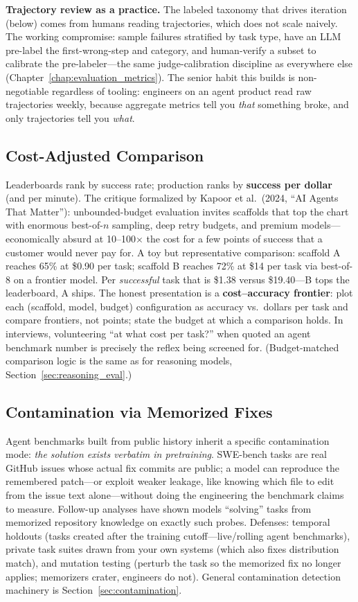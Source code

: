 \textbf{Trajectory review as a practice.} The labeled taxonomy that drives iteration (below) comes from humans reading trajectories, which does not scale naively. The working compromise: sample failures stratified by task type, have an LLM pre-label the first-wrong-step and category, and human-verify a subset to calibrate the pre-labeler---the same judge-calibration discipline as everywhere else (Chapter~\ref{chap:evaluation_metrics}). The senior habit this builds is non-negotiable regardless of tooling: engineers on an agent product read raw trajectories weekly, because aggregate metrics tell you \textit{that} something broke, and only trajectories tell you \textit{what}.

\subsection{Cost-Adjusted Comparison}

Leaderboards rank by success rate; production ranks by \textbf{success per dollar} (and per minute). The critique formalized by Kapoor et al.\ (2024, ``AI Agents That Matter''): unbounded-budget evaluation invites scaffolds that top the chart with enormous best-of-$n$ sampling, deep retry budgets, and premium models---economically absurd at 10--100$\times$ the cost for a few points of success that a customer would never pay for. A toy but representative comparison: scaffold A reaches 65\% at \$0.90 per task; scaffold B reaches 72\% at \$14 per task via best-of-8 on a frontier model. Per \textit{successful} task that is \$1.38 versus \$19.40---B tops the leaderboard, A ships. The honest presentation is a \textbf{cost--accuracy frontier}: plot each (scaffold, model, budget) configuration as accuracy vs.\ dollars per task and compare frontiers, not points; state the budget at which a comparison holds. In interviews, volunteering ``at what cost per task?'' when quoted an agent benchmark number is precisely the reflex being screened for. (Budget-matched comparison logic is the same as for reasoning models, Section~\ref{sec:reasoning_eval}.)

\subsection{Contamination via Memorized Fixes}

Agent benchmarks built from public history inherit a specific contamination mode: \textit{the solution exists verbatim in pretraining}. SWE-bench tasks are real GitHub issues whose actual fix commits are public; a model can reproduce the remembered patch---or exploit weaker leakage, like knowing which file to edit from the issue text alone---without doing the engineering the benchmark claims to measure. Follow-up analyses have shown models ``solving'' tasks from memorized repository knowledge on exactly such probes. Defenses: temporal holdouts (tasks created after the training cutoff---live/rolling agent benchmarks), private task suites drawn from your own systems (which also fixes distribution match), and mutation testing (perturb the task so the memorized fix no longer applies; memorizers crater, engineers do not). General contamination detection machinery is Section~\ref{sec:contamination}.

